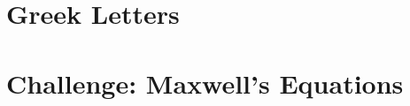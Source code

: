 \documentclass[12pt,a4paper]{article}
\begin{document}


\section{Greek Letters}



\section{Challenge: Maxwell's Equations}

\end{document}

